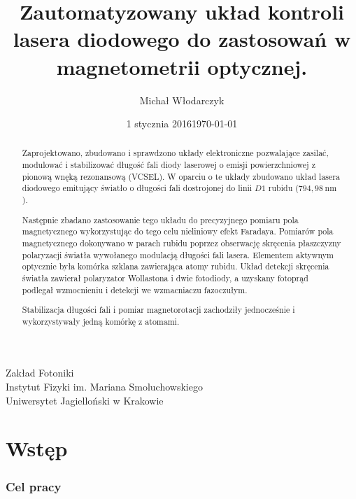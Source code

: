 \documentclass[a4paper,10pt,twoside]{article}
\date{1 stycznia 2016}
\title{Zautomatyzowany układ kontroli lasera diodowego do zastosowań w magnetometrii optycznej.}
\author{Michał Włodarczyk}
\date{\footnotesize{\today}}
\begin{document}



\maketitle
\vspace{0.25\textheight}
\begin{large}
\centering
Zakład Fotoniki\\
Instytut Fizyki im. Mariana Smoluchowskiego\\
Uniwersytet Jagielloński w Krakowie\\
\end{large}
\thispagestyle{empty}

\newpage
\tableofcontents
\thispagestyle{plain}
\setcounter{page}{1}
\newpage

\begin{abstract}
Zaprojektowano, zbudowano i sprawdzono układy elektroniczne pozwalające zasilać, modulować i stabilizować długość fali diody laserowej o emisji powierzchniowej z pionową wnęką rezonansową (VCSEL). W oparciu o te układy zbudowano układ lasera diodowego emitujący światło o długości fali dostrojonej do linii $D1$ rubidu ($794{,}98~ \mathrm{nm}$).

Następnie zbadano zastosowanie tego układu do precyzyjnego pomiaru pola magnetycznego wykorzystując do tego celu nieliniowy efekt Faradaya. Pomiarów pola magnetycznego dokonywano w parach rubidu poprzez obserwację skręcenia płaszczyzny polaryzacji światła wywołanego modulacją długości fali lasera. Elementem aktywnym optycznie była komórka szklana zawierająca atomy rubidu.  Układ detekcji skręcenia światła zawierał polaryzator Wollastona i dwie fotodiody, a uzyskany fotoprąd podlegał wzmocnieniu i detekcji we wzmacniaczu fazoczułym. 

Stabilizacja długości fali i pomiar magnetorotacji zachodziły jednocześnie i wykorzystywały jedną komórkę z atomami.
 
\end{abstract}

\chapter{Wstęp}
\subsection{Cel pracy}

\end{document}
